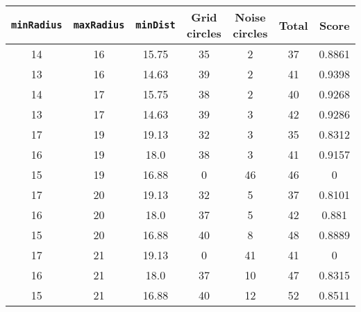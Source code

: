 \documentclass[letterpaper, 12pt]{article}
\begin{document}
\begin{longtable}{|c|c|c|c|c|c|c|}
\hline
\textbf{\texttt{minRadius}} & \textbf{\texttt{maxRadius}} & \textbf{\texttt{minDist}} & \textbf{Grid circles} & \textbf{Noise circles} & \textbf{Total} & \textbf{Score} \\
\hline
14 & 16 & 15.75 & 35 & 2 & 37 & 0.8861 \\
\hline
13 & 16 & 14.63 & 39 & 2 & 41 & 0.9398 \\
\hline
14 & 17 & 15.75 & 38 & 2 & 40 & 0.9268 \\
\hline
13 & 17 & 14.63 & 39 & 3 & 42 & 0.9286 \\
\hline
17 & 19 & 19.13 & 32 & 3 & 35 & 0.8312 \\
\hline
16 & 19 & 18.0 & 38 & 3 & 41 & 0.9157 \\
\hline
15 & 19 & 16.88 & 0 & 46 & 46 & 0 \\
\hline
17 & 20 & 19.13 & 32 & 5 & 37 & 0.8101 \\
\hline
16 & 20 & 18.0 & 37 & 5 & 42 & 0.881 \\
\hline
15 & 20 & 16.88 & 40 & 8 & 48 & 0.8889 \\
\hline
17 & 21 & 19.13 & 0 & 41 & 41 & 0 \\
\hline
16 & 21 & 18.0 & 37 & 10 & 47 & 0.8315 \\
\hline
15 & 21 & 16.88 & 40 & 12 & 52 & 0.8511 \\
\hline
\end{longtable}
\end{document}
